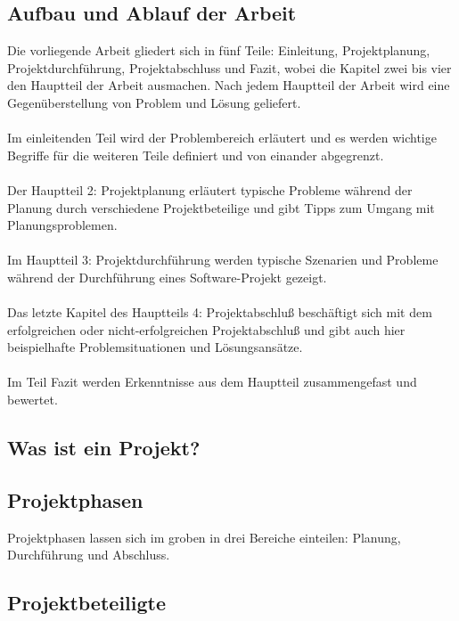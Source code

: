 \documentclass[11pt]{scrartcl}
\begin{document}
\subsection{Aufbau und Ablauf der Arbeit}
Die vorliegende Arbeit gliedert sich in fünf Teile: Einleitung, Projektplanung, Projektdurchführung, Projektabschluss und Fazit, wobei die Kapitel zwei bis vier den Hauptteil der Arbeit ausmachen. Nach jedem Hauptteil der Arbeit wird eine Gegenüberstellung von Problem und Lösung geliefert. 
\\ \\
Im einleitenden Teil wird der Problembereich erläutert und es werden wichtige Begriffe für die weiteren Teile definiert und von einander abgegrenzt. 
\\ \\
Der Hauptteil 2: Projektplanung erläutert typische Probleme während der Planung durch verschiedene Projektbeteilige und gibt Tipps zum Umgang mit Planungsproblemen. 
\\ \\
Im Hauptteil 3: Projektdurchführung werden typische Szenarien und Probleme während der Durchführung eines Software-Projekt gezeigt. 
\\ \\
Das letzte Kapitel des Hauptteils 4: Projektabschluß beschäftigt sich mit dem erfolgreichen oder nicht-erfolgreichen Projektabschluß und gibt auch hier beispielhafte Problemsituationen und Lösungsansätze. 
\\ \\
Im Teil Fazit werden Erkenntnisse aus dem Hauptteil zusammengefast und bewertet. 
\subsection{Was ist ein Projekt?}

\subsection{Projektphasen}

Projektphasen lassen sich im groben in drei Bereiche einteilen: Planung, Durchführung und Abschluss. 

\subsection{Projektbeteiligte}

\pagebreak
\end{document}
